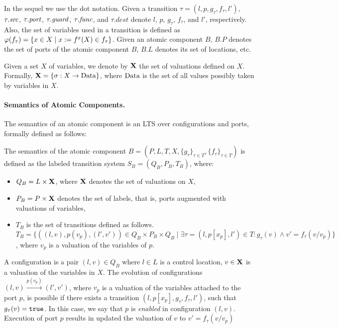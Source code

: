 In the sequel we use the dot notation.
Given a transition $\tau = (l,p,g_\tau,f_\tau,l')$, $\tau.\mathit{src}$, $\tau.\mathit{port}$, $\tau.\mathit{guard}$, $\tau.\mathit{func}$, and $\tau.dest$ denote $l$, $p$, $g_\tau$, $f_\tau$, and $l'$, respectively.
Also, the set of variables used in a transition is defined as $\varphi(f_\tau) = \{x \in X \mid x:= f^x(X) \in f_\tau\}$.
Given an atomic component $B$, $B.P$ denotes the set of ports of the atomic component $B$, $B.L$ denotes its set of locations, etc.

Given a set $X$ of variables, we denote by $\mathbf{X}$ the set of valuations
defined on $X$. Formally, $\mathbf{X} = \{ \sigma : X \rightarrow \mathit{\mathrm{Data}}\}$, where
$\mathit{\mathrm{Data}}$ is the set of all values possibly taken by variables in $X$.

%
\paragraph{Semantics of Atomic Components.}
The semantics of an atomic component is an LTS over configurations and ports, formally defined as follows:
%
\begin{definition}
\label{def:semantic-atom}
The semantics of the atomic component $B = (P,L, T, X, \{g_{\tau}\}_{\tau \in T}, \{f_{\tau}\}_{\tau \in T})$ is defined as the labeled transition system  $S_B = (Q_B, P_B, T_B)$, where: 
\begin{itemize}
\item $Q_B = L\times \mathbf{X}$, where $\mathbf{X}$ denotes the set of valuations on $X$,
\item $P_B = P \times \mathbf{X}$ denotes the set of labels, that is, ports augmented with valuations of variables, 
\item $T_B$ is the set of transitions defined as follows. $T_B= \{ ((l,v),p(v_{p}), (l',v'))\in Q_B\times P_B\times Q_B \mid \exists \tau = (l, p[x_{p}], l') \in T: g_{\tau}(v) \wedge v'=f_{\tau}(v/v_{p})\}$, where $v_{p}$ is a valuation of the variables of $p$.  
\end{itemize}
\end{definition}
%
A configuration is a pair $(l,v)\in Q_B$ where $l \in L$ is a control location, $v \in \mathbf{X}$ is a valuation of the variables in $X$. The evolution of configurations $(l, v)\stackrel{p(v_{p})}{\rightarrow} (l', v')$, where $v_{p}$ is a valuation of the variables attached to the port $p$, is possible if there exists a transition $(l, p[x_p], g_\tau, f_\tau, l')$, such that $g_\tau(v)=\mathtt{true}$. In this case, we say that $p$ is \emph{enabled} in configuration $(l, v)$. Execution of port $p$ results in updated the valuation of $v$ to $v'=f_\tau(v/v_p)$
%
